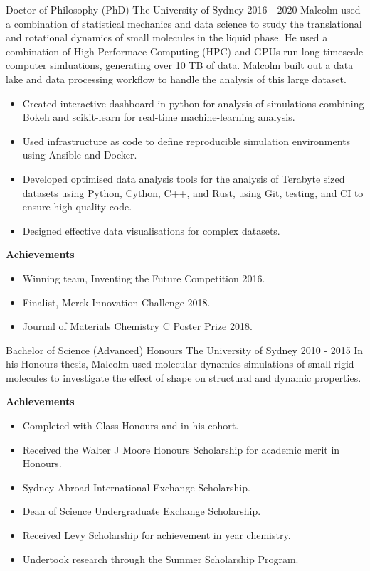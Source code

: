 

\begin{cventry}
  {Doctor of Philosophy (PhD)} %
  {The University of Sydney} %
  {} %
  {2016 - 2020} %
  Malcolm used a combination of statistical mechanics and data science to
  study the translational and rotational dynamics
  of small molecules in the liquid phase.
  He used a combination of High Performace Computing (HPC) and 
  GPUs run long timescale computer simluations,
  generating over 10 TB of data.
  Malcolm built out a data lake and data processing workflow
  to handle the analysis of this large dataset.
  \begin{itemize}
    \item Created interactive dashboard in python for analysis of simulations
      combining Bokeh and scikit-learn for real-time machine-learning analysis.
    \item Used infrastructure as code to define reproducible simulation environments
      using Ansible and Docker.
    \item Developed optimised data analysis tools for the analysis of Terabyte sized
      datasets using Python, Cython, C++, and Rust,
      using Git, testing, and CI to ensure high quality code.
    \item Designed effective data visualisations for complex datasets.
  \end{itemize}
  \textbf{Achievements}
  \begin{itemize}
    \item Winning team, Inventing the Future Competition 2016.
    \item Finalist, Merck Innovation Challenge 2018.
    \item Journal of Materials Chemistry C Poster Prize 2018.
  \end{itemize}
\end{cventry}

\begin{cventry}
  {Bachelor of Science (Advanced) Honours} %
  {The University of Sydney} %
  {} %
  {2010 - 2015} %
  In his Honours thesis,
  Malcolm used molecular dynamics simulations of small rigid molecules
  to investigate the effect of shape on structural and dynamic properties.

  \textbf{Achievements}
  \begin{itemize}
    \item Completed with  Class Honours and  in his cohort.
    \item Received the Walter J Moore Honours Scholarship for academic merit in Honours.
    \item Sydney Abroad International Exchange Scholarship.
    \item Dean of Science Undergraduate Exchange Scholarship.
    \item Received Levy Scholarship for achievement in  year chemistry.
    \item Undertook research through the Summer Scholarship Program.
  \end{itemize}
\end{cventry}

